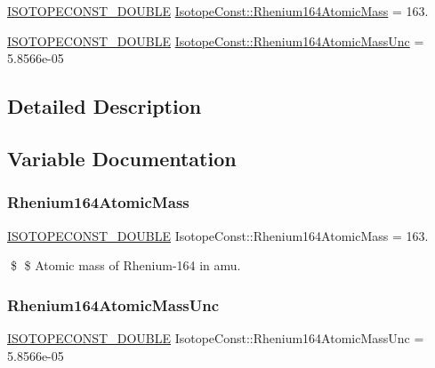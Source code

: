\begin{DoxyCompactItemize}
\item 
\mbox{\hyperlink{group___isotope_const-_macros_ga8f45a7272ce02c0b4c65c44636ed719a}{I\+S\+O\+T\+O\+P\+E\+C\+O\+N\+S\+T\+\_\+\+D\+O\+U\+B\+LE}} \mbox{\hyperlink{group___isotope_const-_rhenium-_re164_gabf40f1b526d28d7c0df17af7f1abb56f}{Isotope\+Const\+::\+Rhenium164\+Atomic\+Mass}} = 163.
\item 
\mbox{\hyperlink{group___isotope_const-_macros_ga8f45a7272ce02c0b4c65c44636ed719a}{I\+S\+O\+T\+O\+P\+E\+C\+O\+N\+S\+T\+\_\+\+D\+O\+U\+B\+LE}} \mbox{\hyperlink{group___isotope_const-_rhenium-_re164_gab45e018bb1c818588b992045626d0206}{Isotope\+Const\+::\+Rhenium164\+Atomic\+Mass\+Unc}} = 5.\+8566e-\/05
\end{DoxyCompactItemize}


\subsection{Detailed Description}


\subsection{Variable Documentation}
\mbox{\label{group___isotope_const-_rhenium-_re164_gabf40f1b526d28d7c0df17af7f1abb56f}} 
\subsubsection{\texorpdfstring{Rhenium164\+Atomic\+Mass}{Rhenium164AtomicMass}}
{\footnotesize\ttfamily \mbox{\hyperlink{group___isotope_const-_macros_ga8f45a7272ce02c0b4c65c44636ed719a}{I\+S\+O\+T\+O\+P\+E\+C\+O\+N\+S\+T\+\_\+\+D\+O\+U\+B\+LE}} Isotope\+Const\+::\+Rhenium164\+Atomic\+Mass = 163.}

\$ \$ Atomic mass of Rhenium-\/164 in amu. \mbox{\label{group___isotope_const-_rhenium-_re164_gab45e018bb1c818588b992045626d0206}} 
\subsubsection{\texorpdfstring{Rhenium164\+Atomic\+Mass\+Unc}{Rhenium164AtomicMassUnc}}
{\footnotesize\ttfamily \mbox{\hyperlink{group___isotope_const-_macros_ga8f45a7272ce02c0b4c65c44636ed719a}{I\+S\+O\+T\+O\+P\+E\+C\+O\+N\+S\+T\+\_\+\+D\+O\+U\+B\+LE}} Isotope\+Const\+::\+Rhenium164\+Atomic\+Mass\+Unc = 5.\+8566e-\/05}

